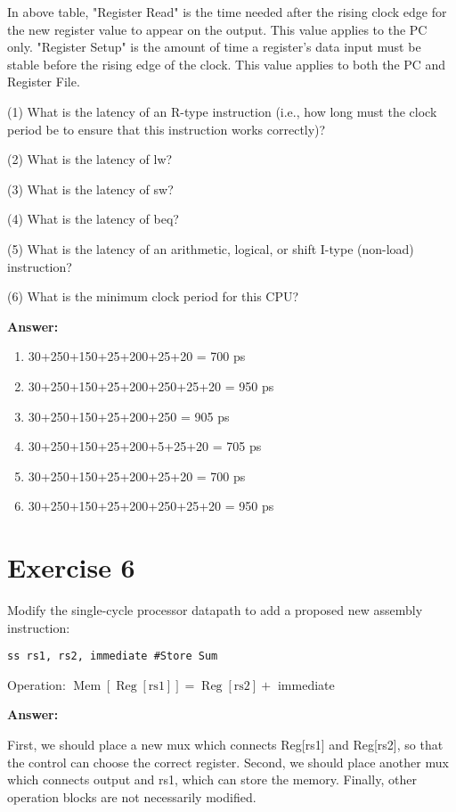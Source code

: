 \documentclass[11pt,a4paper]{article}
\begin{document}
\vspace{0.3cm}

In above table, "Register Read" is the time needed after the rising clock edge for the new register value to appear on the output. This value applies to the PC only. "Register Setup" is the amount of time a register's data input must be stable before the rising edge of the clock. This value applies to both the $\mathrm{PC}$ and Register File.

(1) What is the latency of an R-type instruction (i.e., how long must the clock period be to ensure that this instruction works correctly)? 

(2) What is the latency of lw? 

(3) What is the latency of sw? 

(4) What is the latency of beq? 

(5) What is the latency of an arithmetic, logical, or shift I-type (non-load) instruction? 

(6) What is the minimum clock period for this CPU?

\vspace{0.3cm}

\textbf{Answer:}

\begin{enumerate}[(1)]
    \item 30+250+150+25+200+25+20 = 700 ps
    \item 30+250+150+25+200+250+25+20 = 950 ps
    \item 30+250+150+25+200+250 = 905 ps
    \item 30+250+150+25+200+5+25+20 = 705 ps
    \item 30+250+150+25+200+25+20 = 700 ps
    \item 30+250+150+25+200+250+25+20 = 950 ps
\end{enumerate}









\section*{Exercise 6}

Modify the single-cycle processor datapath to add a proposed new assembly instruction:

\verb|ss rs1, rs2, immediate #Store Sum|

Operation: $\operatorname{Mem}[\operatorname{Reg}[\mathrm{rs} 1]]=\operatorname{Reg}[\mathrm{rs} 2]+$ immediate

\vspace{0.3cm}

\textbf{Answer:}

First, we should place a new mux which connects Reg[rs1] and Reg[rs2], so that the control can choose the correct register. Second, we should place another mux which connects output and rs1, which can store the memory. Finally, other operation blocks are not necessarily modified.
\end{document}
